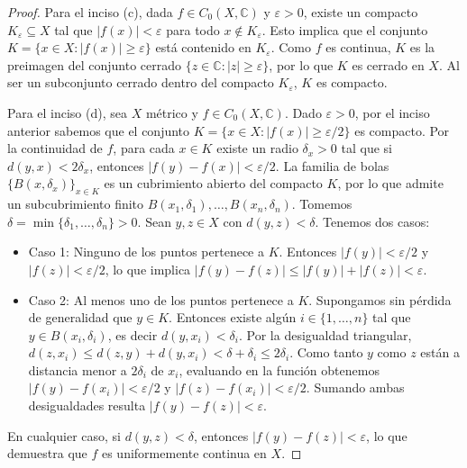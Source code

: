 \documentclass{article}
\theoremstyle{plain}
\theoremstyle{definition}
\begin{document}
\begin{proof}
    Para el inciso (c), dada \( f \in C_0(X, \mathbb{C}) \) y \( \varepsilon > 0 \), existe un compacto \( K_\varepsilon \subseteq X \) tal que \( |f(x)| < \varepsilon \) para todo \( x \notin K_\varepsilon \).
    Esto implica que el conjunto \( K = \{ x \in X : |f(x)| \geq \varepsilon \} \) está contenido en \( K_\varepsilon \). Como \( f \) es continua, \( K \) es la preimagen del conjunto cerrado \( \{ z \in \mathbb{C} : |z| \ge \varepsilon \} \), por lo que \( K \) es cerrado en \( X \). Al ser un subconjunto cerrado dentro del compacto \( K_\varepsilon \), \( K \) es compacto.

    Para el inciso (d), sea \( X \) métrico y \( f \in C_0(X, \mathbb{C}) \). Dado \( \varepsilon > 0 \), por el inciso anterior sabemos que el conjunto \( K = \{ x \in X : |f(x)| \ge \varepsilon/2 \} \) es compacto.
    Por la continuidad de \( f \), para cada \( x \in K \) existe un radio \( \delta_x > 0 \) tal que si \( d(y,x) < 2\delta_x \), entonces \( |f(y) - f(x)| < \varepsilon/2 \).
    La familia de bolas \( {\{ B(x, \delta_x) \}}_{x \in K} \) es un cubrimiento abierto del compacto \( K \), por lo que admite un subcubrimiento finito \( B(x_1, \delta_1), \dots, B(x_n, \delta_n) \).
    Tomemos \( \delta = \min \{ \delta_1, \dots, \delta_n \} > 0 \). Sean \( y, z \in X \) con \( d(y,z) < \delta \). Tenemos dos casos:
    \begin{itemize}
        \item Caso 1: Ninguno de los puntos pertenece a \( K \). Entonces \( |f(y)| < \varepsilon/2 \) y \( |f(z)| < \varepsilon/2 \), lo que implica \( |f(y) - f(z)| \le |f(y)| + |f(z)| < \varepsilon \).
        \item Caso 2: Al menos uno de los puntos pertenece a \( K \). Supongamos sin pérdida de generalidad que \( y \in K \). Entonces existe algún \( i \in \{1,\dots,n\} \) tal que \( y \in B(x_i, \delta_i) \), es decir \( d(y, x_i) < \delta_i \).
              Por la desigualdad triangular, \( d(z, x_i) \le d(z, y) + d(y, x_i) < \delta + \delta_i \le 2\delta_i \).
              Como tanto \( y \) como \( z \) están a distancia menor a \( 2\delta_i \) de \( x_i \), evaluando en la función obtenemos \( |f(y) - f(x_i)| < \varepsilon/2 \) y \( |f(z) - f(x_i)| < \varepsilon/2 \). Sumando ambas desigualdades resulta \( |f(y) - f(z)| < \varepsilon \).
    \end{itemize}
    En cualquier caso, si \( d(y,z) < \delta \), entonces \( |f(y) - f(z)| < \varepsilon \), lo que demuestra que \( f \) es uniformemente continua en \( X \).
\end{proof}
\end{document}
